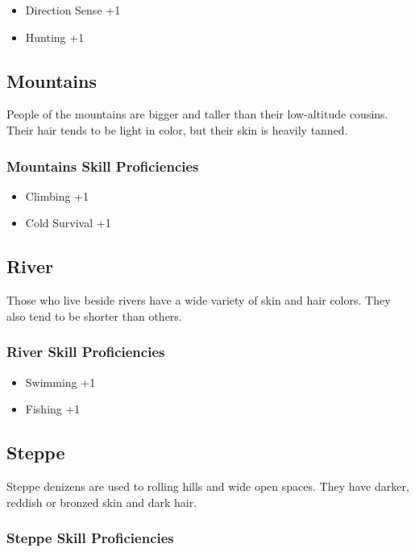 \begin{multicols}{2}
\begin{itemize}
    \item Direction Sense +1
    \item Hunting +1
\end{itemize}

\subsection{Mountains}

People of the mountains are bigger and taller than their low-altitude
cousins. Their hair tends to be light in color, but their skin is heavily
tanned.

\subsubsection{Mountains Skill Proficiencies}

\begin{itemize}
    \item Climbing +1
    \item Cold Survival +1
\end{itemize}

\subsection{River}

Those who live beside rivers have a wide variety of skin and hair colors.
They also tend to be shorter than others.

\subsubsection{River Skill Proficiencies}

\begin{itemize}
    \item Swimming +1
    \item Fishing +1
\end{itemize}

\subsection{Steppe}

Steppe denizens are used to rolling hills and wide open spaces. They have
darker, reddish or bronzed skin and dark hair.

\subsubsection{Steppe Skill Proficiencies}


\end{multicols}
